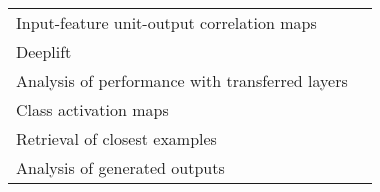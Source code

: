 \begin{tabular}{ll}
Input-feature unit-output correlation maps             &                                                                                                                                                                          \cite{Schirrmeister2017} \\
Deeplift                                               &                                                                                                                                                                                \cite{Lawhern2018} \\
Analysis of performance with transferred layers        &                                                                                                                                                                            \cite{Hajinoroozi2017} \\
Class activation maps                                  &                                                                                                                                                                                  \cite{Ghosh2018} \\
Retrieval of closest examples                          &                                                                                                                                                                                  \cite{Deiss2018} \\
Analysis of generated outputs                          &                                                                                                                                                                               \cite{Hartmann2018} \\
\bottomrule
\end{tabular}

